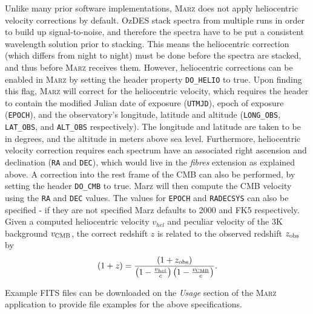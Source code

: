 \documentclass[5p]{elsarticle}
\newcommand{\marz}{\textsc{Marz}}
\begin{document}
Unlike many prior software implementations, \marz{} does not apply heliocentric velocity corrections by default. OzDES stack spectra from multiple runs in order to build up signal-to-noise, and therefore the spectra have to be put a consistent wavelength solution prior to stacking. This means the heliocentric correction (which differs from night to night) must be done before the spectra are stacked, and thus before \marz{} receives them. However, heliocentric corrections can be enabled in \marz{} by setting the header property \verb;DO_HELIO; to true. Upon finding this flag, \marz{} will correct for the heliocentric velocity, which requires the header to contain the modified Julian date of exposure (\verb;UTMJD;), epoch of exposure (\verb;EPOCH;), and the observatory's longitude, latitude and altitude (\verb;LONG_OBS;, \verb;LAT_OBS;, and \verb;ALT_OBS; respectively). The longitude and latitude are taken to be in degrees, and the altitude in meters above sea level. Furthermore, heliocentric velocity correction requires each spectrum have an associated right ascension and declination (\verb;RA; and \verb;DEC;), which would live in the \textit{fibres} extension as explained above. A correction into the rest frame of the CMB can also be performed, by setting the header \verb;DO_CMB; to true. Marz will then compute the CMB velocity using the \verb;RA; and \verb;DEC; values. The values for \verb;EPOCH; and \verb;RADECSYS; can also be specified - if they are not specified Marz defaults to 2000 and FK5 respectively. Given a computed heliocentric velocity $v_{hel}$ and peculiar velocity of the 3K background $v_{\rm CMB}$, the correct redshift $z$ is related to the observed redshift $z_{\rm obs}$ by
\begin{equation}
(1 + z) = \frac{(1 + z_{\rm obs})}{\left(1 - \frac{v_{hel}}{c}\right)\left(1 - \frac{v_{\rm CMB}}{c}\right)}.
\end{equation}

Example FITS files can be downloaded on the \textit{Usage} section of the \marz{} application to provide file examples for the above specifications.
\end{document}
